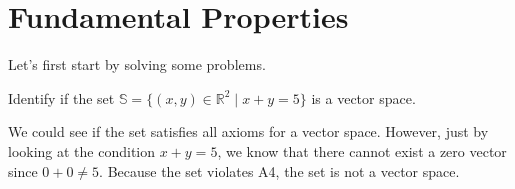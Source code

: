 \documentclass[../main.tex]{subfiles}
\begin{document}
\section{Fundamental Properties}

Let's first start by solving some problems.

\begin{problem}{}{}
Identify if the set $\mathbb{S} = \{ (x, y) \in \mathbb{R}^2 \mid
x + y = 5 \}$ is a vector space.
\end{problem}
\begin{solution}
We could see if the set satisfies all axioms for a vector space.
However, just by looking at the condition $x + y = 5$, we know that
there cannot exist a zero vector since $0 + 0 \neq 5$. Because the
set violates A4, the set is not a vector space.
\end{solution}
\end{document}
